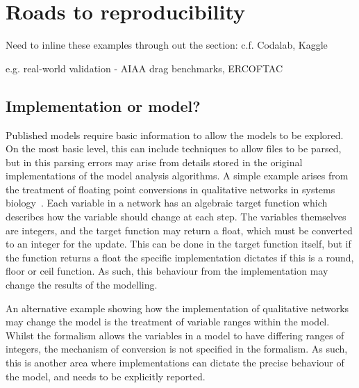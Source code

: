 \documentclass[conference]{IEEEtran}
\begin{document}

\section{Roads to reproducibility}



Need to inline these examples through out the section: 
	c.f. Codalab, Kaggle

	e.g. real-world validation - AIAA drag benchmarks, ERCOFTAC


\subsection{Implementation or model?}

Published models require basic information to allow the models to be
explored. On the most basic level, this can include techniques to allow
files to be parsed, but in this parsing errors may arise from details 
stored in the original implementations of the model analysis algorithms.
A simple example arises from the treatment of floating point conversions
in qualitative networks in systems biology~\cite{Schaub2007}. Each
variable in a network has an algebraic target function which describes
how the variable should change at each step. The variables themselves are
integers, and the target function may return a float, which must be converted
to an integer for the update. This can be done in the target function 
itself, but if the function returns a float the specific implementation
dictates if this is a round, floor or ceil function. As such, this behaviour
from the implementation may change the results of the modelling.

An alternative example showing how the implementation of qualitative networks
may change the model is the treatment of variable ranges within the model.
Whilst the formalism allows the variables in a model to have differing 
ranges of integers, the mechanism of conversion is not specified in the 
formalism. As such, this is another area where implementations can dictate
the precise behaviour of the model, and needs to be explicitly reported.
\end{document}
